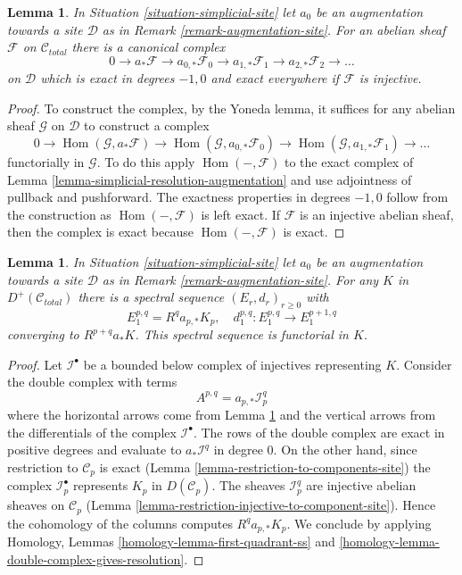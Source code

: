 \documentclass{stacks-project}
\theoremstyle{plain}
\newtheorem{lemma}[subsection]{Lemma}
\theoremstyle{definition}
\theoremstyle{remark}
\numberwithin{equation}{subsection}
\def\Hom{\mathop{\mathrm{Hom}}\nolimits}
\begin{document}
\begin{lemma}
\label{lemma-augmentation-cech-complex}
In Situation \ref{situation-simplicial-site} let
$a_0$ be an augmentation towards a site $\mathcal{D}$
as in Remark \ref{remark-augmentation-site}.
For an abelian sheaf $\mathcal{F}$ on $\mathcal{C}_{total}$
there is a canonical complex
$$
0 \to a_*\mathcal{F} \to a_{0, *}\mathcal{F}_0 \to a_{1, *}\mathcal{F}_1 \to
a_{2, *}\mathcal{F}_2 \to \ldots
$$
on $\mathcal{D}$ which is exact in degrees $-1, 0$ and
exact everywhere if $\mathcal{F}$ is injective.
\end{lemma}

\begin{proof}
To construct the complex, by the Yoneda lemma, it suffices for any
abelian sheaf $\mathcal{G}$ on $\mathcal{D}$ to construct a complex
$$
0 \to \Hom(\mathcal{G}, a_*\mathcal{F}) \to
\Hom(\mathcal{G}, a_{0, *}\mathcal{F}_0) \to
\Hom(\mathcal{G}, a_{1, *}\mathcal{F}_1) \to \ldots
$$
functorially in $\mathcal{G}$. To do this apply $\Hom(-, \mathcal{F})$
to the exact complex of Lemma \ref{lemma-simplicial-resolution-augmentation}
and use adjointness of pullback and pushforward.
The exactness properties in degrees $-1, 0$ follow from
the construction as $\Hom(-, \mathcal{F})$ is left exact.
If $\mathcal{F}$ is an injective abelian sheaf, then the
complex is exact because $\Hom(-, \mathcal{F})$ is exact.
\end{proof}

\begin{lemma}
\label{lemma-augmentation-spectral-sequence}
In Situation \ref{situation-simplicial-site} let
$a_0$ be an augmentation towards a site $\mathcal{D}$
as in Remark \ref{remark-augmentation-site}.
For any $K$ in $D^+(\mathcal{C}_{total})$ there is a spectral
sequence 
$(E_r, d_r)_{r \geq 0}$ with
$$
E_1^{p, q} = R^qa_{p, *} K_p,\quad
d_1^{p, q} : E_1^{p, q} \to E_1^{p + 1, q}
$$
converging to $R^{p + q}a_*K$. This spectral sequence is functorial in $K$.
\end{lemma}

\begin{proof}
Let $\mathcal{I}^\bullet$ be a bounded below complex of injectives
representing $K$. Consider the double complex with terms
$$
A^{p, q} = a_{p, *}\mathcal{I}^q_p
$$
where the horizontal arrows come from
Lemma \ref{lemma-augmentation-cech-complex}
and the vertical arrows from the differentials of the
complex $\mathcal{I}^\bullet$. The rows of the double complex are exact
in positive degrees and evaluate to $a_*\mathcal{I}^q$ in degree $0$.
On the other hand, since restriction to $\mathcal{C}_p$ is exact
(Lemma \ref{lemma-restriction-to-components-site})
the complex $\mathcal{I}_p^\bullet$ represents $K_p$ in
$D(\mathcal{C}_p)$. The sheaves $\mathcal{I}_p^q$ are injective
abelian sheaves on $\mathcal{C}_p$
(Lemma \ref{lemma-restriction-injective-to-component-site}).
Hence the cohomology of the columns computes $R^qa_{p, *}K_p$.
We conclude by applying
Homology, Lemmas \ref{homology-lemma-first-quadrant-ss} and
\ref{homology-lemma-double-complex-gives-resolution}.
\end{proof}
\end{document}
